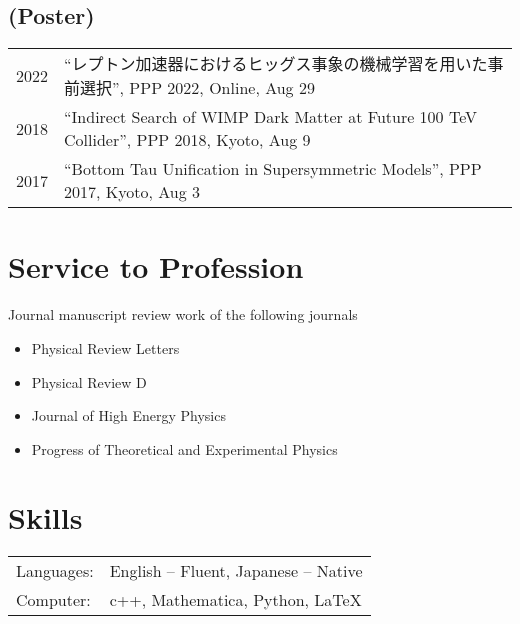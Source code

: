 \documentclass[12pt]{article}
\begin{document}
\subsection*{(Poster)}
\begin{table}[H]\begin{tabular}{lp{6in}}2022 & ``レプトン加速器におけるヒッグス事象の機械学習を用いた事前選択'', PPP 2022, Online, Aug 29 \\2018 & ``Indirect Search of WIMP Dark Matter at Future 100 TeV Collider'', PPP 2018, Kyoto, Aug 9 \\2017 & ``Bottom Tau Unification in Supersymmetric Models'', PPP 2017, Kyoto, Aug 3 \\\end{tabular}\end{table}

\section*{Service to Profession}
\vspace*{1em}
Journal manuscript review work of the following journals
\begin{itemize}
  \setlength\itemsep{0em}
  \item Physical Review Letters
  \item Physical Review D
  \item Journal of High Energy Physics
  \item Progress of Theoretical and Experimental Physics
\end{itemize}

\section*{Skills}
\begin{table}[H]
  \begin{tabular}{lp{6in}}
    Languages: & English -- Fluent, Japanese -- Native \\
    Computer: & c++, Mathematica, Python, LaTeX
  \end{tabular}
\end{table}
\end{document}
